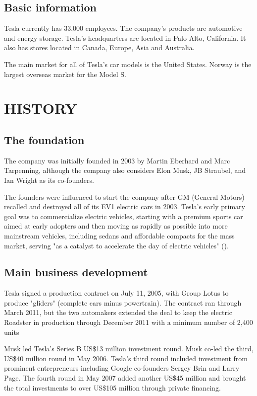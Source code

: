 \documentclass[12pt]{article}
\begin{document}
\subsection{Basic information}
Tesla currently has 33,000 employees. The company’s products are automotive and energy storage. Tesla's headquarters are located in Palo Alto, California. It also has stores located in Canada, Europe, Asia and Australia.

The main market for all of Tesla’s car models is the United States. Norway is the largest overseas market for the Model S.

\section{HISTORY}

\subsection{The foundation}
The company was initially founded in 2003 by Martin Eberhard and Marc Tarpenning, although the company also considers Elon Musk, JB Straubel, and Ian Wright as its co-founders.

The founders were influenced to start the company after GM (General Motors) recalled and destroyed all of its EV1 electric cars in 2003. Tesla's early primary goal was to commercialize electric vehicles, starting with a premium sports car aimed at early adopters and then moving as rapidly as possible into more mainstream vehicles, including sedans and affordable compacts for the mass market, serving "as a catalyst to accelerate the day of electric vehicles" (\cite{bry16}).

\subsection{Main business development}
Tesla signed a production contract on July 11, 2005, with Group Lotus to produce "gliders" (complete cars minus powertrain). The contract ran through March 2011, but the two automakers extended the deal to keep the electric Roadster in production through December 2011 with a minimum number of 2,400 units

Musk led Tesla's Series B US\$13 million investment round. Musk co-led the third, US\$40 million round in May 2006. Tesla's third round included investment from prominent entrepreneurs including Google co-founders Sergey Brin and Larry Page. The fourth round in May 2007 added another US\$45 million and brought the total investments to over US\$105 million through private financing.
\end{document}
